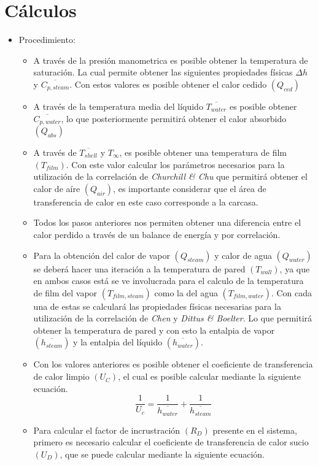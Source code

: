 \documentclass[twoside,twocolumn,letter,10pt]{article}
\begin{document}
\section{Cálculos}
\begin{itemize}
\item{Procedimiento:}
\begin{itemize}
\item{A través de la presión manometrica es posible obtener la temperatura de saturación. La cual permite obtener las siguientes propiedades físicas $\Delta h$ y $\overline{C_{p,steam}}$. Con estos valores es posible obtener el calor cedido $(Q_{ced})$}
\item{A través de la temperatura media del líquido $\overline{T_{water}}$ es posible obtener $\overline{C_{p,water}}$, lo que posteriormente permitirá obtener el calor absorbido $(Q_{abs})$ }
\item{A través de $\overline{T_{shell}}$ y $T_{\infty}$, es posible obtener una temperatura de film $(T_{film})$. Con este valor calcular los parámetros necesarios para la utilización de la correlación de \textit{Churchill \& Chu} que permitirá obtener el calor de aíre $(Q_{air})$, es importante considerar que el área de transferencia de calor en este caso corresponde a la carcasa. }
\item{Todos los pasos anteriores nos permiten obtener una diferencia entre el calor perdido a través de un balance de energía y por correlación. }
\newpage
\item{Para la obtención del calor de vapor $(Q_{steam})$ y calor de agua $(Q_{water})$ se deberá hacer una iteración a la temperatura de pared $(T_{wall})$, ya que en ambos casos está se ve involucrada para el calculo de la temperatura de film del vapor $(T_{film,steam})$ como la del agua $(T_{film,water})$. Con cada una de estas se calculará las propiedades físicas necesarias para la utilización de la correlación de \textit{Chen } y \textit{Dittus \& Boelter}. Lo que permitirá obtener la temperatura de pared y con esto la entalpia de vapor $(\overline{h_{steam}})$ y la entalpia del líquido $(\overline{h_{water}})$. }
\item{Con los valores anteriores es posible obtener el coeficiente de transferencia de calor limpio $(U_C)$, el cual es posible calcular mediante la siguiente ecuación.
$$\frac{1}{U_c}=\frac{1}{\overline{h_{water}}}+\frac{1}{\overline{h_{steam}}}$$}
\item{Para calcular el factor de incrustración $(R_D)$ presente en el sistema, primero es necesario calcular el coeficiente de transferencia de calor sucio $(U_D)$, que se puede calcular mediante la siguiente ecuación.
}
\end{itemize}
\end{itemize}
\end{document}
